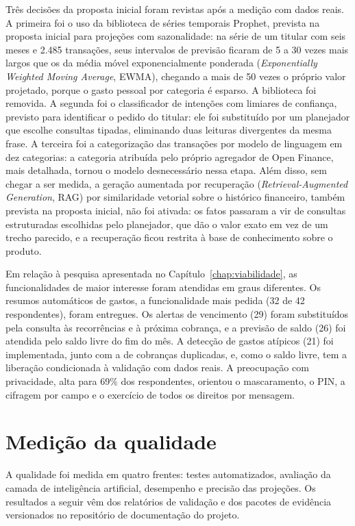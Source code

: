 Três decisões da proposta inicial foram revistas após a medição com dados reais. A primeira foi o uso da biblioteca de séries temporais Prophet, prevista na proposta inicial para projeções com sazonalidade: na série de um titular com seis meses e 2.485 transações, seus intervalos de previsão ficaram de 5 a 30 vezes mais largos que os da média móvel exponencialmente ponderada (\textit{Exponentially Weighted Moving Average}, EWMA), chegando a mais de 50 vezes o próprio valor projetado, porque o gasto pessoal por categoria é esparso. A biblioteca foi removida. A segunda foi o classificador de intenções com limiares de confiança, previsto para identificar o pedido do titular: ele foi substituído por um planejador que escolhe consultas tipadas, eliminando duas leituras divergentes da mesma frase. A terceira foi a categorização das transações por modelo de linguagem em dez categorias: a categoria atribuída pelo próprio agregador de Open Finance, mais detalhada, tornou o modelo desnecessário nessa etapa. Além disso, sem chegar a ser medida, a geração aumentada por recuperação (\textit{Retrieval-Augmented Generation}, RAG) por similaridade vetorial sobre o histórico financeiro, também prevista na proposta inicial, não foi ativada: os fatos passaram a vir de consultas estruturadas escolhidas pelo planejador, que dão o valor exato em vez de um trecho parecido, e a recuperação ficou restrita à base de conhecimento sobre o produto.

Em relação à pesquisa apresentada no Capítulo~\ref{chap:viabilidade}, as funcionalidades de maior interesse foram atendidas em graus diferentes. Os resumos automáticos de gastos, a funcionalidade mais pedida (32 de 42 respondentes), foram entregues. Os alertas de vencimento (29) foram substituídos pela consulta às recorrências e à próxima cobrança, e a previsão de saldo (26) foi atendida pelo saldo livre do fim do mês. A detecção de gastos atípicos (21) foi implementada, junto com a de cobranças duplicadas, e, como o saldo livre, tem a liberação condicionada à validação com dados reais. A preocupação com privacidade, alta para 69\% dos respondentes, orientou o mascaramento, o PIN, a cifragem por campo e o exercício de todos os direitos por mensagem.

\section{Medição da qualidade}

A qualidade foi medida em quatro frentes: testes automatizados, avaliação da camada de inteligência artificial, desempenho e precisão das projeções. Os resultados a seguir vêm dos relatórios de validação e dos pacotes de evidência versionados no repositório de documentação do projeto.

